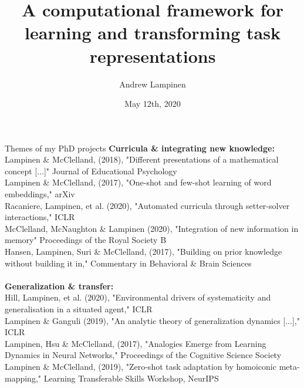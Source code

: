 \documentclass{beamer}
\begin{document}
\title{A computational framework for learning and transforming task representations}
\author{Andrew Lampinen}
\date{May 12th, 2020}
\frame{\titlepage}


\begin{frame}{Themes of my PhD projects}
\textbf{Curricula \& integrating new knowledge:}\\[0.5em]
{\tiny {}
Lampinen \& McClelland, (2018), "Different presentations of a mathematical concept [...]" Journal of Educational Psychology\\[0.25em]
Lampinen \& McClelland, (2017), "One-shot and few-shot learning of word embeddings," arXiv\\[0.25em]
Racaniere, Lampinen, et al. (2020), "Automated curricula through setter-solver interactions," ICLR\\[0.25em]
McClelland, McNaughton \& Lampinen (2020), "Integration of new information in memory" Proceedings of the Royal Society B\\[0.25em]
Hansen, Lampinen, Suri \& McClelland, (2017), "Building on prior knowledge without building it in," Commentary in Behavioral \& Brain Sciences\\[0.25em]
}\\[1em]
\textbf{Generalization \& transfer:}\\[0.5em]
{\tiny
{
Hill, Lampinen, et al. (2020), "Environmental drivers of systematicity and generalisation in a situated agent," ICLR\\[0.25em]
Lampinen \& Ganguli (2019), "An analytic theory of generalization dynamics [...]," ICLR \\[0.25em]
Lampinen, Hsu \& McClelland, (2017), "Analogies Emerge from Learning Dynamics in Neural Networks," Proceedings of the Cognitive Science Society\\[0.25em]
}{
Lampinen \& McClelland, (2019), "Zero-shot task adaptation by homoiconic meta-mapping," Learning Transferable Skills Workshop, NeurIPS\\
}}


\end{frame}
\end{document}
